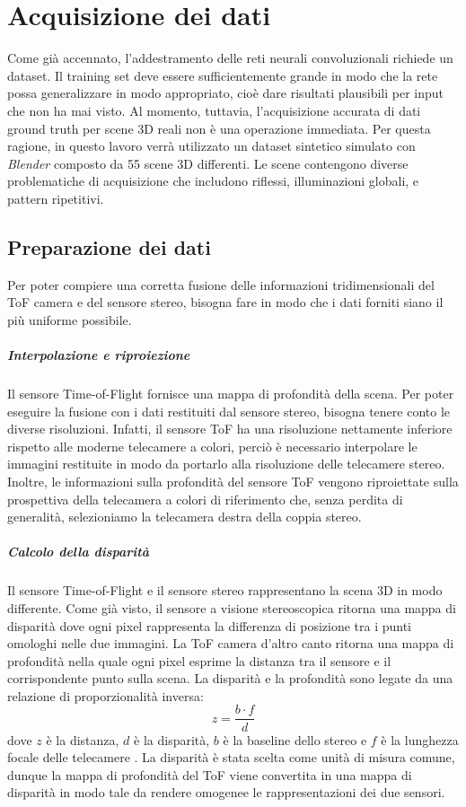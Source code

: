 \chapter{Acquisizione dei dati}
Come già accennato, l'addestramento delle reti neurali convoluzionali richiede un dataset. Il training set deve essere sufficientemente grande in modo che la rete possa generalizzare in modo appropriato, cioè dare risultati plausibili per input che non ha mai visto. Al momento, tuttavia, l'acquisizione accurata di dati ground truth per scene 3D reali non è una operazione immediata. Per questa ragione, in questo lavoro verrà utilizzato un dataset sintetico simulato con \textit{Blender} composto da 55 scene 3D differenti. Le scene contengono diverse problematiche di acquisizione che includono riflessi, illuminazioni globali, e pattern ripetitivi. 

\section{Preparazione dei dati}
Per poter compiere una corretta fusione delle informazioni tridimensionali del ToF camera e del sensore stereo, bisogna fare in modo che i dati forniti siano il più uniforme possibile.

\paragraph{Interpolazione e riproiezione}
Il sensore Time-of-Flight fornisce una mappa di profondità della scena. Per poter eseguire la fusione con i dati restituiti dal sensore stereo, bisogna tenere conto le diverse risoluzioni. Infatti, il sensore ToF ha una risoluzione nettamente inferiore rispetto alle moderne telecamere a colori, perciò è necessario interpolare le immagini restituite in modo da portarlo alla risoluzione delle telecamere stereo.\\
Inoltre, le informazioni sulla profondità del sensore ToF vengono riproiettate sulla prospettiva della telecamera a colori di riferimento che, senza perdita di generalità, selezioniamo la telecamera destra della coppia stereo. 

\paragraph{Calcolo della disparità}
Il sensore Time-of-Flight e il sensore stereo rappresentano la scena 3D in modo differente. Come già visto, il sensore a visione stereoscopica ritorna una mappa di disparità dove ogni pixel rappresenta la differenza di posizione tra i punti omologhi nelle due immagini. La ToF camera d'altro canto ritorna una mappa di profondità nella quale ogni pixel esprime la distanza tra il sensore e il corrispondente punto sulla scena. La disparità e la profondità sono legate da una relazione di proporzionalità inversa:
$$z=\frac{b\cdot f}{d}$$
dove $z$ è la distanza, $d$ è la disparità, $b$ è la baseline dello stereo e $f$ è la lunghezza focale delle telecamere \cite{rif1}. La disparità è stata scelta come unità di misura comune, dunque la mappa di profondità del ToF viene convertita in una mappa di disparità in modo tale da rendere omogenee le rappresentazioni dei due sensori.

